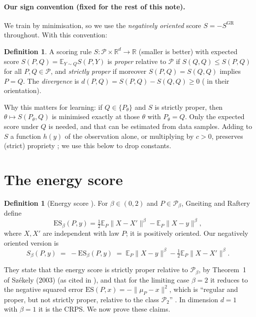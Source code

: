 \documentclass[11pt]{article}
\theoremstyle{definition}
\newtheorem{definition}[theorem]{Definition}
\theoremstyle{remark}
\newcommand{\R}{\mathbb{R}}
\newcommand{\E}{\mathbb{E}}
\newcommand{\Pb}{\mathcal{P}}
\newcommand{\norm}[1]{\lVert #1\rVert}
\newcommand{\Sb}{S_\beta}
\begin{document}
\paragraph{Our sign convention (fixed for the rest of this note).} We train by minimisation, so we use the
\emph{negatively oriented} score $S=-S^{\mathrm{GR}}$ throughout. With this convention:
\begin{definition}\label{def:proper}
A scoring rule $S:\Pb\times\R^d\to\R$ (smaller is better) with expected score
$S(P,Q)=\E_{Y\sim Q}S(P,Y)$ is \emph{proper} relative to $\Pb$ if $S(Q,Q)\le S(P,Q)$ for all $P,Q\in\Pb$, and
\emph{strictly proper} if moreover $S(P,Q)=S(Q,Q)$ implies $P=Q$. The \emph{divergence} is
$d(P,Q)=S(P,Q)-S(Q,Q)\ge0$ (\cite[eq.~(7)]{GR2007} in their orientation).
\end{definition}
Why this matters for learning: if $Q\in\{P_\theta\}$ and $S$ is strictly proper, then
$\theta\mapsto S(P_\theta,Q)$ is minimised exactly at those $\theta$ with $P_\theta=Q$. Only the expected score
under $Q$ is needed, and that can be estimated from data samples. Adding to $S$ a function $h(y)$ of the
observation alone, or multiplying by $c>0$, preserves (strict) propriety \cite[eq.~(2)]{GR2007}; we use this
below to drop constants.

\section{The energy score}\label{sec:es}
\begin{definition}[Energy score {\cite[Sec.~4.3, eq.~(22)]{GR2007}}]\label{def:es}
For $\beta\in(0,2)$ and $P\in\Pb_\beta$, Gneiting and Raftery define
\[
\mathrm{ES}_\beta(P,y)=\tfrac12\E_P\norm{X-X'}^\beta-\E_P\norm{X-y}^\beta,
\]
where $X,X'$ are independent with law $P$; it is positively oriented. Our negatively oriented version is
\begin{equation}\label{eq:es}
\Sb(P,y)\;=\;-\mathrm{ES}_\beta(P,y)\;=\;\E_P\norm{X-y}^\beta-\tfrac12\E_P\norm{X-X'}^\beta .
\end{equation}
\end{definition}
They state that the energy score is strictly proper relative to $\Pb_\beta$, by Theorem~1 of
Sz\'ekely (2003) (as cited in \cite{GR2007}), and that for the limiting case $\beta=2$ it reduces to the
negative squared error $\mathrm{ES}(P,x)=-\norm{\mu_P-x}^2$, which is ``regular and proper, but not strictly
proper, relative to the class $\Pb_2$'' \cite[eq.~(23)]{GR2007}. In dimension $d=1$ with $\beta=1$ it is
the CRPS. We now prove these claims.
\end{document}

